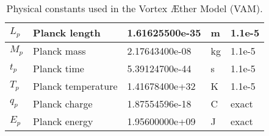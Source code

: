\documentclass[a4paper, aps,preprint,superscriptaddress, 12pt]{revtex4}
\begin{document}
\begin{table}[H]
\begin{tabular}{|l|l|l|l|l|}
        $L_p$ & Planck length & 1.61625500e-35 & m & 1.1e-5 \\ \hline%
        $M_p$ & Planck mass & 2.17643400e-08 & kg & 1.1e-5 \\ \hline%
        $t_p$ & Planck time & 5.39124700e-44 & s & 1.1e-5 \\ \hline%
        $T_p$ & Planck temperature & 1.41678400e+32 & K & 1.1e-5 \\ \hline%
        $q_p$ & Planck charge & 1.87554596e-18 & C & exact \\ \hline%
        $E_p$ & Planck energy & 1.95600000e+09 & J & exact \\ \hline%
    \end{tabular}
    \caption{Physical constants used in the Vortex Æther Model (VAM).}
    \label{tab:physical_constants1}
\end{table}
\end{document}
